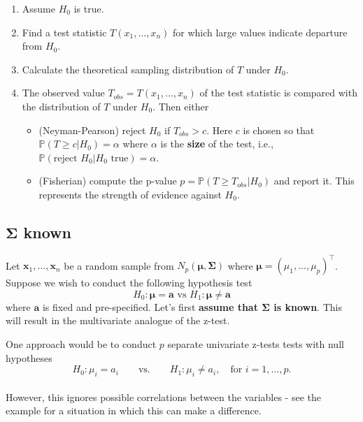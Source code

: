 \documentclass[]{book}
\providecommand{\tightlist}{%
  \setlength{\itemsep}{0pt}\setlength{\parskip}{0pt}}
\theoremstyle{definition}
\theoremstyle{definition}
\theoremstyle{definition}
\theoremstyle{remark}
\begin{document}
\begin{enumerate}
\def\labelenumi{\arabic{enumi}.}
\item
  Assume \(H_0\) is true.
\item
  Find a test statistic \(T(x_1, \ldots, x_n)\) for which large values indicate departure from \(H_0\).
\item
  Calculate the theoretical sampling distribution of \(T\) under \(H_0\).
\item
  The observed value \(T_{obs}=T(x_1, \ldots, x_n)\) of the test statistic is compared with the distribution of \(T\) under \(H_0\). Then either

  \begin{itemize}
  \tightlist
  \item
    (Neyman-Pearson) reject \(H_0\) if \(T_{obs}>c\). Here \(c\) is chosen so that \(\mathbb{P}(T\geq c| H_0)=\alpha\) where \(\alpha\) is the \textbf{size} of the test, i.e., \(\mathbb{P}(\mbox{reject } H_0 | H_0 \mbox{ true})=\alpha\).
  \item
    (Fisherian) compute the p-value \(p=\mathbb{P}(T\geq T_{obs}|H_0)\) and report it. This represents the strength of evidence against \(H_0\).
  \end{itemize}
\end{enumerate}

\hypertarget{onesampleSigma}{%
\subsection{\texorpdfstring{\(\boldsymbol{\Sigma}\) known}{\textbackslash{}boldsymbol\{\textbackslash{}Sigma\} known}}\label{onesampleSigma}}

Let \(\mathbf x_1,\ldots,\mathbf x_n\) be a random sample from \(N_p({\boldsymbol{\mu}},\boldsymbol{\Sigma})\) where
\({\boldsymbol{\mu}}= (\mu_1,\ldots,\mu_p)^\top\). Suppose we wish to conduct the following hypothesis test \[H_0: {\boldsymbol{\mu}}= \mathbf a\mbox{ vs } H_1: {\boldsymbol{\mu}}\neq \mathbf a\] where \(\mathbf a\) is fixed and pre-specified.
Let's first \textbf{assume that \(\boldsymbol{\Sigma}\) is known}. This will result in the multivariate analogue of the z-test.

One approach would be to conduct \(p\) separate univariate z-tests tests with null hypotheses
\[H_0: \mu_i = a_i \qquad \text{vs.} \qquad H_1: \mu_i \neq a_i, \quad \mbox{for } i=1,\ldots,p.\]\\
However, this ignores possible correlations between the variables - see the example for a situation in which this can make a difference.
\end{document}
